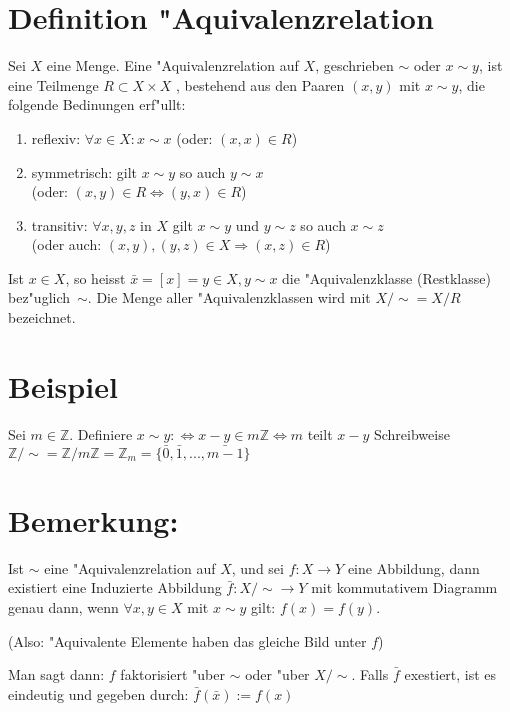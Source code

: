 \documentclass[12pt,a4paper,ngerman]{scrreprt}
\newcommand{\gdw}{\Leftrightarrow}
\begin{document}
\section{Definition "Aquivalenzrelation}
Sei $X$ eine Menge. Eine "Aquivalenzrelation auf $X$, geschrieben $\sim$ oder $x \sim y$, ist eine Teilmenge $R \subset X\times X$ , bestehend aus den Paaren $(x,y)$ mit $x \sim y$, die folgende Bedinungen erf"ullt:
\begin{enumerate}
\item reflexiv: $\forall x \in X: x\sim x$ (oder: $(x,x) \in R$)
\item symmetrisch: gilt $x\sim y$ so auch $y \sim x$ \\ (oder: $(x,y) \in R \gdw (y,x) \in R$)
\item transitiv: $\forall x,y,z$ in $X$ gilt $x \sim y$ und $y \sim z$ so auch $x \sim z$ \\ (oder auch: $(x,y),(y,z) \in X \Rightarrow (x,z)\in R$)
\end{enumerate}
Ist $x \in X $, so heisst $\bar{x} = [x] = {y \in X, y\sim x}$ die "Aquivalenzklasse (Restklasse) bez"uglich~$\sim$. Die Menge aller "Aquivalenzklassen wird mit $X/\!\sim  = 
X /R$ bezeichnet.

\section{Beispiel}

Sei $m \in \mathbb{Z}$. Definiere $x \sim y :\gdw x-y \in m \mathbb{Z} \gdw m$ teilt $x-y$
Schreibweise $\mathbb{Z}/\sim = \mathbb{Z}/m\mathbb{Z} = \mathbb{Z}_m = \{\bar{0}, \bar{1}, ..., \bar{m-1}\}$

\section{Bemerkung:}

Ist $\sim$ eine "Aquivalenzrelation auf $X$, und sei $f: X \to Y$ eine Abbildung, dann existiert eine Induzierte Abbildung $\bar{f}: X/\sim \to Y$ mit kommutativem Diagramm 
genau dann, wenn $\forall x, y \in X $ mit $x \sim y$ gilt: $f(x) = f(y)$.

(Also: "Aquivalente Elemente haben das gleiche Bild unter $f$)

Man sagt dann: $f$ faktorisiert "uber $\sim$ oder "uber $X/\!\sim$. Falls $\bar{f}$ exestiert, ist es eindeutig und gegeben durch: $\bar{f}(\bar{x}):=f(x)$
\end{document}
